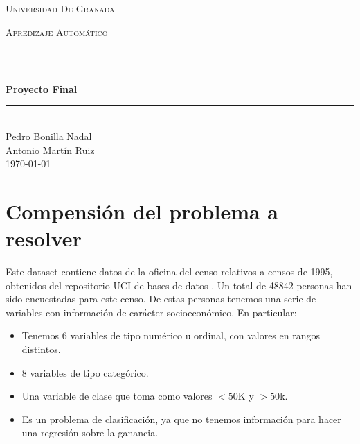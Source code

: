 \documentclass[11pt,a4paper]{article}
\date{\today}
\begin{document}
\begin{titlepage}
\begin{center}

\vspace*{.06\textheight}
{\scshape\LARGE Universidad De Granada\par}\vspace{1.5cm} %
\textsc{\Large Apredizaje Automático}\\[0.5cm] %

\rule{\textwidth}{0.4mm} \\[0.4cm] %
{\huge \bfseries Proyecto Final\par}\vspace{0.4cm} %

\rule{\textwidth}{0.4mm} \\[11.5cm] %
 {\Large Pedro Bonilla Nadal\\Antonio Martín Ruiz}\\[1cm]

 {\today}

\vfill
\end{center}
\end{titlepage}

\setcounter{tocdepth}{2}
\tableofcontents
\newpage



\section{Compensión del problema a resolver }

Este dataset contiene datos de la oficina del censo\cite{census} relativos a censos de 1995, obtenidos del repositorio UCI de bases de datos \cite{uci}. Un total de 48842 personas han sido encuestadas para este censo. De estas personas tenemos una serie de variables con información de carácter socioeconómico. En particular:
\begin{itemize}
\item Tenemos 6 variables de tipo numérico u ordinal, con valores en rangos distintos.
\item 8 variables de tipo categórico.
\item Una variable de clase que toma como valores $<50$K y $>50$k.
\item Es un problema de clasificación, ya que no tenemos información para hacer una regresión sobre la ganancia.
\end{itemize}
\end{document}
